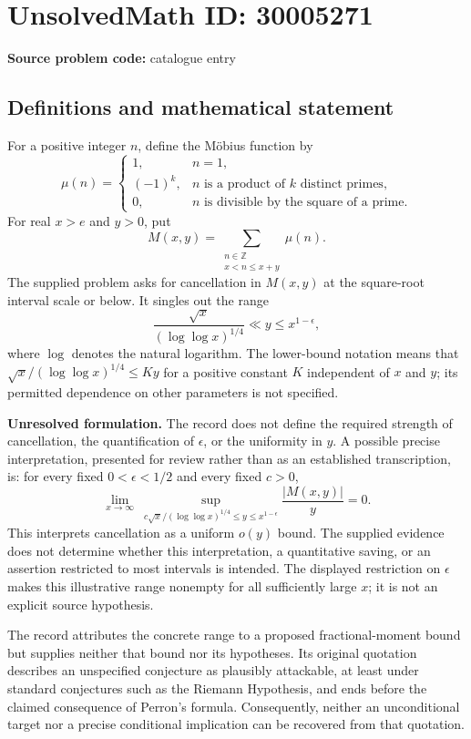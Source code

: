\documentclass[11pt]{article}
\newcommand{\Z}{\mathbb{Z}}
\begin{document}
\section*{UnsolvedMath ID: 30005271}
\textbf{Source problem code:} catalogue entry
\subsection{Definitions and mathematical statement}
For a positive integer \(n\), define the Möbius function by
\[
\mu(n)=\begin{cases}
1,&n=1,\\
(-1)^k,&n\text{ is a product of }k\text{ distinct primes},\\
0,&n\text{ is divisible by the square of a prime}.
\end{cases}
\]
For real \(x>e\) and \(y>0\), put
\[
M(x,y)=\sum_{\substack{n\in\Z\\x<n\le x+y}}\mu(n).
\]
The supplied problem asks for cancellation in \(M(x,y)\) at the square-root interval scale or below. It singles out the range
\[
\frac{\sqrt{x}}{(\log\log x)^{1/4}}\ll y\le x^{1-\epsilon},
\]
where \(\log\) denotes the natural logarithm. The lower-bound notation means that \(\sqrt{x}/(\log\log x)^{1/4}\le K y\) for a positive constant \(K\) independent of \(x\) and \(y\); its permitted dependence on other parameters is not specified.

\textbf{Unresolved formulation.} The record does not define the required strength of cancellation, the quantification of \(\epsilon\), or the uniformity in \(y\). A possible precise interpretation, presented for review rather than as an established transcription, is: for every fixed \(0<\epsilon<1/2\) and every fixed \(c>0\),
\[
\lim_{x\to\infty}\ \sup_{\displaystyle c\sqrt{x}/(\log\log x)^{1/4}\le y\le x^{1-\epsilon}}
\frac{|M(x,y)|}{y}=0.
\]
This interprets cancellation as a uniform \(o(y)\) bound. The supplied evidence does not determine whether this interpretation, a quantitative saving, or an assertion restricted to most intervals is intended. The displayed restriction on \(\epsilon\) makes this illustrative range nonempty for all sufficiently large \(x\); it is not an explicit source hypothesis.

The record attributes the concrete range to a proposed fractional-moment bound but supplies neither that bound nor its hypotheses. Its original quotation describes an unspecified conjecture as plausibly attackable, at least under standard conjectures such as the Riemann Hypothesis, and ends before the claimed consequence of Perron's formula. Consequently, neither an unconditional target nor a precise conditional implication can be recovered from that quotation.
\end{document}
